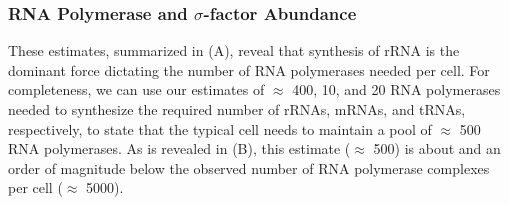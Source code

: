 \subsubsection{RNA Polymerase and $\sigma$-factor Abundance} 
These estimates, summarized in  (A), reveal that synthesis
of rRNA is the dominant force dictating the number of RNA polymerases needed
per cell. For completeness, we can use our estimates of $\approx$ 400, 10,
and 20 RNA polymerases needed to synthesize the required number of rRNAs,
mRNAs, and tRNAs, respectively, to state that the typical cell needs to
maintain a pool of $\approx$ 500 RNA polymerases. As is revealed in
 (B), this estimate ($\approx$ 500) is about and an order
of magnitude below the observed number of RNA polymerase complexes per cell
($\approx$ 5000). 
